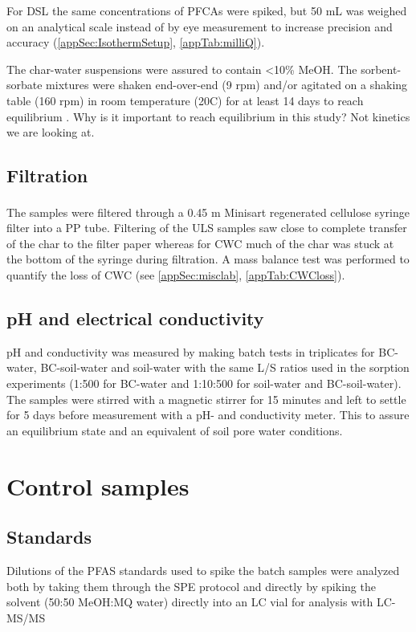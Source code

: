 For DSL the same concentrations of PFCAs were spiked, but 50 mL was weighed on an analytical scale instead of by eye measurement to increase precision and accuracy (\cref{appSec:IsothermSetup}, \cref{appTab:milliQ}).

The char-water suspensions were assured to contain \textless 10\% MeOH. The sorbent-sorbate mixtures were shaken end-over-end (9 rpm) and/or agitated on a shaking table (160 rpm) in room temperature (20\textdegree C) for at least 14 days to reach equilibrium \citep{higgins2006}. Why is it important to reach equilibrium in this study? Not kinetics we are looking at. 

\subsection{Filtration}
The samples were filtered through a 0.45 \textmu m Minisart\textsuperscript{\textregistered} regenerated cellulose syringe filter into a PP tube. Filtering of the ULS samples saw close to complete transfer of the char to the filter paper whereas for CWC much of the char was stuck at the bottom of the syringe during filtration. A mass balance test was performed to quantify the loss of CWC (see \cref{appSec:misclab}, \cref{appTab:CWCloss}).

\subsection{pH and electrical conductivity}
pH and conductivity was measured by making batch tests in triplicates for BC-water, BC-soil-water and soil-water with the same L/S ratios used in the sorption experiments (1:500 for BC-water and 1:10:500 for soil-water and BC-soil-water). The samples were stirred with a magnetic stirrer for 15 minutes and left to settle for 5 days before measurement with a pH- and conductivity meter. This to assure an equilibrium state and an equivalent of soil pore water conditions.

\section{Control samples}
\subsection{Standards}
Dilutions of the PFAS standards used to spike the batch samples were analyzed both by taking them through the SPE protocol and directly by spiking the solvent (50:50 MeOH:MQ water) directly into an LC vial for analysis with LC-MS/MS 

